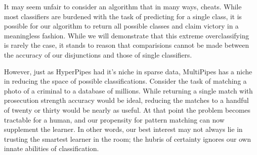 It may seem unfair to consider an algorithm that in many ways, cheats. While most classifiers are burdened with the task of predicting for a single class, it is possible for our algorithm to return all possible classes and claim victory in a meaningless fashion. While we will demonstrate that this extreme overclassifying is rarely the case, it stands to reason that comparisions cannot be made between the accuracy of our disjunctions and those of single classifiers.

However, just as HyperPipes had it's niche in sparse data, MultiPipes has a niche in reducing the space of possible classifications. Consider the task of matching a photo of a criminal to a database of millions. While returning a single match with prosecution strength accuracy would be ideal, reducing the matches to a handful of twenty or thirty would be nearly as useful. At that point the problem becomes tractable for a human, and our propensity for pattern matching can now supplement the learner. In other words, our best interest may not always lie in trusting the smartest learner in the room; the hubris of certainty ignores our own innate abilities of classification.
